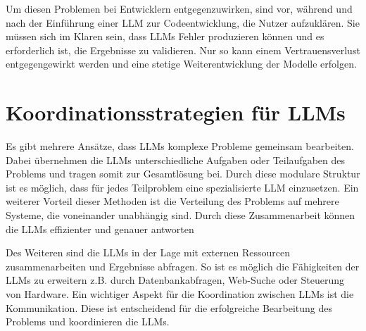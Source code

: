 Um diesen Problemen bei Entwicklern entgegenzuwirken, sind vor, während und nach der Einführung einer LLM zur Codeentwicklung, die Nutzer aufzuklären. Sie müssen sich im Klaren sein, dass LLMs Fehler produzieren können und es erforderlich ist, die Ergebnisse zu validieren. Nur so kann einem Vertrauensverlust entgegengewirkt werden und eine stetige Weiterentwicklung der Modelle erfolgen.






\section{Koordinationsstrategien für LLMs}
Es gibt mehrere Ansätze, dass LLMs komplexe Probleme gemeinsam bearbeiten. Dabei übernehmen die LLMs unterschiedliche Aufgaben oder Teilaufgaben des Problems und tragen somit zur Gesamtlösung bei. Durch diese modulare Struktur ist es möglich, dass für jedes Teilproblem eine spezialisierte LLM einzusetzen. Ein weiterer Vorteil dieser Methoden ist die Verteilung des Problems auf mehrere Systeme, die voneinander unabhängig sind. Durch diese Zusammenarbeit können die LLMs effizienter und genauer antworten\vspace{0.2cm}

Des Weiteren sind die LLMs in der Lage mit externen Ressourcen zusammenarbeiten und Ergebnisse abfragen. So ist es möglich die Fähigkeiten der LLMs zu erweitern z.B. durch Datenbankabfragen, Web-Suche oder Steuerung von Hardware. Ein wichtiger Aspekt für die Koordination zwischen LLMs ist die Kommunikation. Diese ist entscheidend für die erfolgreiche Bearbeitung des Problems und koordinieren die LLMs.\vspace{0.2cm}


